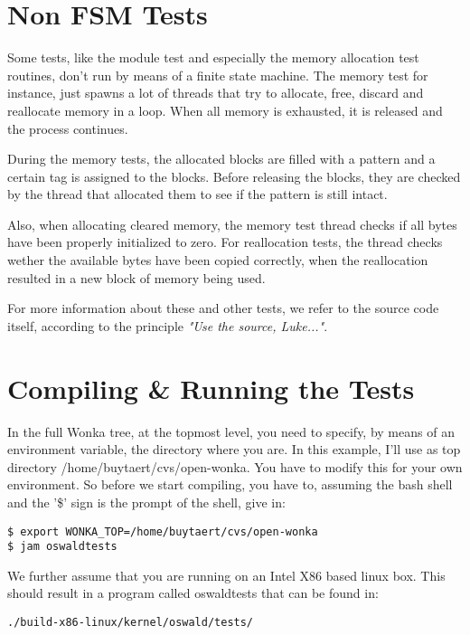 \section{Non FSM Tests}

Some tests, like the module test and especially the memory allocation test
routines, don't run by means of a finite state machine. The memory test for
instance, just spawns a lot of threads that try to allocate, free, discard
and reallocate memory in a loop. When all memory is exhausted, it is
released and the process continues.

During the memory tests, the allocated blocks are filled with a pattern and
a certain tag is assigned to the blocks. Before releasing the blocks, they
are checked by the thread that allocated them to see if the pattern is still
intact.

Also, when allocating cleared memory, the memory test thread checks if all
bytes have been properly initialized to zero. For reallocation tests, the
thread checks wether the available bytes have been copied correctly, when
the reallocation resulted in a new block of memory being used.

For more information about these and other tests, we refer to the source
code itself, according to the principle \textit{"Use the source, Luke..."}.

\section{Compiling \& Running the Tests}

In the full Wonka tree, at the topmost level, you need to specify, by means
of an environment variable, the directory where you are. In this example,
I'll use as top directory \textsf{/home/buytaert/cvs/open-wonka}. You have
to modify this for your own environment. So before we start compiling, you
have to, assuming the bash shell and the '\$' sign is the prompt of the
shell, give in:

\begin{verbatim}
$ export WONKA_TOP=/home/buytaert/cvs/open-wonka
$ jam oswaldtests
\end{verbatim}

We further assume that you are running on an Intel X86 based linux box.
This should result in a program called \textsf{oswaldtests} that can be
found in:

\begin{verbatim}
./build-x86-linux/kernel/oswald/tests/
\end{verbatim}

